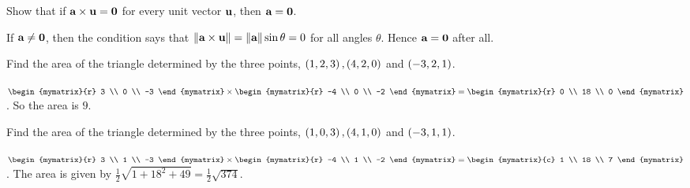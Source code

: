 \begin{enumialphparenastyle}

\begin{ex}
  Show that if $\mbox{\bf a}\times \mbox{\bf u}=\mbox{\bf 0}$ for every unit
  vector $\mbox{\bf u}$, then $\mbox{\bf a}=\mbox{\bf 0}$.
  \begin{sol}
    If $\mbox{\bf a}\neq \mbox{\bf 0}$, then the condition says that
    $\left\|\mbox{\bf a}\times \mbox{\bf u}\right\| = \left\|\mbox{\bf a}\right\| \sin \theta =0$
    for all angles $\theta$. Hence $\mbox{\bf a} = \mbox{\bf 0}$ after all.
  \end{sol}
\end{ex}

\begin{ex}
  Find the area of the triangle determined by the three points,
  $\left( 1,2,3\right) ,\left(4,2,0\right) $ and $\left(-3,2,1\right)$.
  \begin{sol}
    $\begin{mymatrix}{r}
      3 \\
      0 \\
      -3
    \end{mymatrix} \times \begin{mymatrix}{r}
      -4 \\
      0 \\
      -2
    \end{mymatrix} =\begin{mymatrix}{r}
      0 \\
      18 \\
      0
    \end{mymatrix}$. So the area is $9$.
  \end{sol}
\end{ex}

\begin{ex}
  Find the area of the triangle determined by the three points,
  $\left( 1,0,3\right) ,\left(4,1,0\right) $ and $\left(-3,1,1\right)$.
  \begin{sol}
    $\begin{mymatrix}{r}
      3 \\
      1 \\
      -3
    \end{mymatrix} \times \begin{mymatrix}{r}
      -4 \\
      1 \\
      -2
    \end{mymatrix} =\begin{mymatrix}{c}
      1 \\
      18 \\
      7
    \end{mymatrix}$. The area is given by
    $\displaystyle\frac{1}{2}\sqrt{1+18^{2}+49}=\frac{1}{2}\sqrt{374}$.
  \end{sol}
\end{ex}


\end{enumialphparenastyle}
